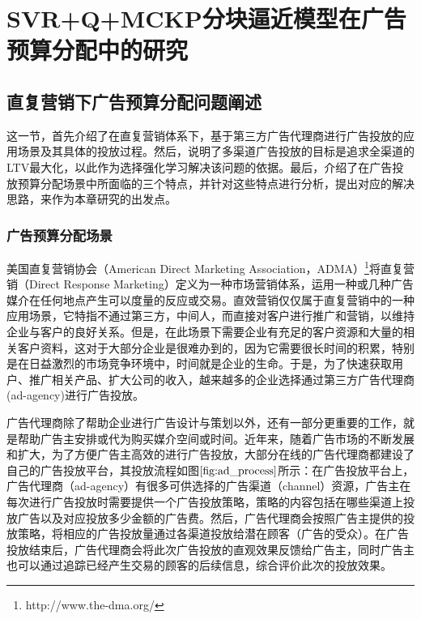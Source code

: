 

\chapter{SVR+Q+MCKP分块逼近模型在广告预算分配中的研究}


\section{直复营销下广告预算分配问题阐述}
这一节，首先介绍了在直复营销体系下，基于第三方广告代理商进行广告投放的应用场景及其具体的投放过程。然后，说明了多渠道广告投放的目标是追求全渠道的LTV最大化，以此作为选择强化学习解决该问题的依据。最后，介绍了在广告投放预算分配场景中所面临的三个特点，并针对这些特点进行分析，提出对应的解决思路，来作为本章研究的出发点。

\subsection{广告预算分配场景}
美国直复营销协会（American Direct Marketing Association，ADMA）\footnote{http://www.the-dma.org/}将直复营销（Direct Response Marketing）定义为一种市场营销体系，运用一种或几种广告媒介在任何地点产生可以度量的反应或交易。直效营销仅仅属于直复营销中的一种应用场景，它特指不通过第三方，中间人，而直接对客户进行推广和营销，以维持企业与客户的良好关系。但是，在此场景下需要企业有充足的客户资源和大量的相关客户资料，这对于大部分企业是很难办到的，因为它需要很长时间的积累，特别是在日益激烈的市场竞争环境中，时间就是企业的生命。于是，为了快速获取用户、推广相关产品、扩大公司的收入，越来越多的企业选择通过第三方广告代理商(ad-agency)进行广告投放。

广告代理商除了帮助企业进行广告设计与策划以外，还有一部分更重要的工作，就是帮助广告主安排或代为购买媒介空间或时间。近年来，随着广告市场的不断发展和扩大，为了方便广告主高效的进行广告投放，大部分在线的广告代理商都建设了自己的广告投放平台，其投放流程如图$\ref{fig:ad_process}$所示：在广告投放平台上，广告代理商（ad-agency）有很多可供选择的广告渠道（channel）资源，广告主在每次进行广告投放时需要提供一个广告投放策略，策略的内容包括在哪些渠道上投放广告以及对应投放多少金额的广告费。然后，广告代理商会按照广告主提供的投放策略，将相应的广告投放量通过各渠道投放给潜在顾客（广告的受众）。在广告投放结束后，广告代理商会将此次广告投放的直观效果反馈给广告主，同时广告主也可以通过追踪已经产生交易的顾客的后续信息，综合评价此次的投放效果。

